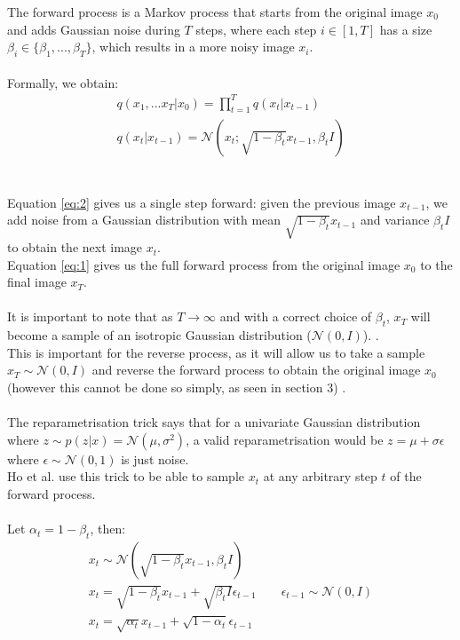 \documentclass{article}
\begin{document}
The forward process is a Markov process that starts from the original image $x_0$ and adds Gaussian noise during $T$ steps, where each step $i \in [1, T]$ has a size $\beta_i \in \{ \beta_1, ..., \beta_T \}$, which results in a more noisy image $x_i$. \cite{ho2020denoising}
\\\\
Formally, we obtain:
\begin{gather}
  q(x_{1}, ... x_{T} | x_0) = \prod_{t = 1}^T{q(x_t | x_{t - 1})} \label{eq:1} \\
  q(x_t | x_{t-1}) = \mathcal{N}(x_t; \sqrt{1 - \beta_t}x_{t-1}, \beta_t I) \label{eq:2}
\end{gather}
\\\\
Equation \ref{eq:2} gives us a single step forward: given the previous image $x_{t-1}$, we add noise from a Gaussian distribution with mean $\sqrt{1 - \beta_t}x_{t-1}$ and variance $\beta_t I$ to obtain the next image $x_t$. \\
Equation \ref{eq:1} gives us the full forward process from the original image $x_0$ to the final image $x_T$.
\\\\
It is important to note that as $T \rightarrow \infty$ and with a correct choice of $\beta_t$,  $x_T$ will become a sample of an isotropic Gaussian distribution ($\mathcal{N}(0, I)$). \cite{nichol2021improved} \cite{sohldickstein2015deep}. \\
This is important for the reverse process, as it will allow us to take a sample $x_T \sim \mathcal{N}(0, I)$ and reverse the forward process to obtain the original image $x_0$ (however this cannot be done so simply, as seen in section 3) \cite{nichol2021improved}.
\\\\
The reparametrisation trick says that for a univariate Gaussian distribution where $z \sim p(z | x) = \mathcal{N}(\mu, \sigma^2)$, a valid reparametrisation would be $z = \mu + \sigma \epsilon$ where $\epsilon \sim \mathcal{N}(0, 1)$ is just noise. \cite{kingma2022autoencoding} \\
Ho et al. \cite{ho2020denoising} use this trick to be able to sample $x_t$ at any arbitrary step $t$ of the forward process.
\\\\
Let $\alpha_t = 1 - \beta_t$, then:
\begin{gather*}
  x_t \sim \mathcal{N}(\sqrt{1 - \beta_t} x_{t-1}, \beta_t I) \\
  x_t = \sqrt{1 - \beta_t} x_{t-1} + \sqrt{\beta_t I} \epsilon_{t-1} \qquad \epsilon_{t - 1} \sim \mathcal{N}(0, I) \\
  x_t = \sqrt{\alpha_t} x_{t-1} + \sqrt{1 - \alpha_t} \epsilon_{t - 1}
\end{gather*}
\end{document}
